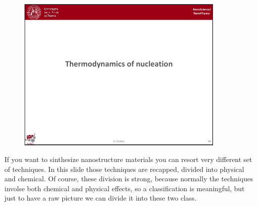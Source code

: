 \documentclass[../main/main.tex]{subfiles}
\begin{document}
\begin{figure}[h!]
\centering
\includegraphics[page=2,width=0.9\textwidth]{../lessons/pdf_file/6_lesson.pdf}
\end{figure}

If you want to sinthesize nanostructure materials you can resort very different set of techniques. In this slide those techniques are recapped, divided into physical and chemical. Of course, these division is strong, because normally the techniques involse both chemical and physical effects, so a classification is meaningful, but just to have a raw picture we can divide it into these two class.
\end{document}
